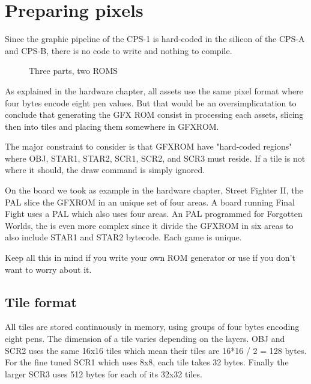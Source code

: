 \chapter{Preparing pixels}
Since the graphic pipeline of the CPS-1 is hard-coded in the silicon of the CPS-A and CPS-B, there is no code to write and nothing to compile. 

\begin{figure}[H]
\caption*{Three parts, two ROMS}
\end{figure}

As explained in the hardware chapter, all assets use the same pixel format where four bytes encode eight pen values. But that would be an oversimplicatation to conclude that generating the GFX ROM consist in processing each assets, slicing then into tiles and placing them somewhere in GFXROM.

The major constraint to consider is that GFXROM have "hard-coded regions" where OBJ, STAR1, STAR2, SCR1, SCR2, and SCR3 must reside. If a tile is not where it should, the draw command is simply ignored.

On the board we took as example in the hardware chapter, Street Fighter II, the  PAL slice the GFXROM in an unique set of four areas. A board running Final Fight uses a  PAL which also uses four areas. An PAL programmed for Forgotten Worlds, the  is even more complex since it divide the GFXROM in six areas to also include STAR1 and STAR2 bytecode. Each game is unique. 

Keep all this in mind if you write your own ROM generator or use  if you don't want to worry about it.

\section{Tile format}
All tiles are stored continuously in memory, using groups of four bytes encoding eight pens. The dimension of a tile varies depending on the layers. OBJ and SCR2 uses the same 16x16 tiles which mean their tiles are 16*16 / 2 = 128 bytes. For the fine tuned SCR1 which uses 8x8, each tile takes 32 bytes. Finally the larger SCR3 uses 512 bytes for each of its 32x32 tiles.

